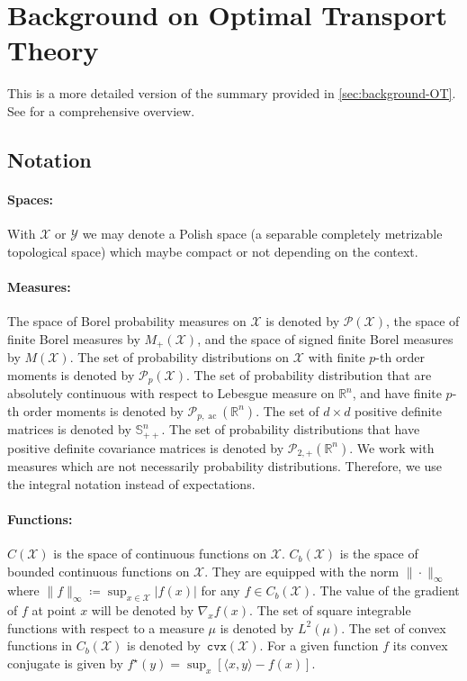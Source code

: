 \documentclass[10pt]{article}
\newcommand{\op}[1]{\operatorname{#1}}
\newcommand{\cvx}{\mathtt{cvx}}
\newcommand{\real}{\mathbb{R}}
\newcommand{\calP}{\mathcal{P}}
\newcommand{\calX}{\mathcal{X}}
\newcommand{\calY}{\mathcal{Y}}
\numberwithin{equation}{section}
\begin{document}
\appendix
\newpage
\section{Background on Optimal Transport Theory}\label{app:background-OT}
This is a more detailed version of the summary provided in \autoref{sec:background-OT}. See \citet{villani2003topics} for a comprehensive overview. 
\subsection{Notation} 

\paragraph{Spaces:} With $\calX$ or $\calY$ we may denote a Polish space (a separable completely metrizable topological space) which maybe compact or not depending on the context. 

\paragraph{Measures:}
The space of Borel probability measures on $\calX$ is denoted by $\calP(\calX)$, the space of finite Borel measures by $M_+(\calX)$, and the space of signed finite Borel measures by $M(\calX)$. 
The set of probability distributions on $\calX$ with finite $p$-th order moments is denoted by $\mathcal{P}_p(\calX)$. 
The set of probability distribution that are absolutely continuous with respect to Lebesgue measure on $\real^n$, and have finite $p$-th order moments is denoted by $\mathcal{P}_{p,\op{ac}}(\real^n)$. 
The set of $d\times d$ positive definite matrices is denoted by $\mathbb{S}^n_{++}$. 
The set of probability distributions that have positive definite covariance matrices is denoted by $\mathcal{P}_{2,+}(\real^n)$.
We work with measures which are not necessarily probability distributions. Therefore, we use the integral notation instead of expectations. 

\paragraph{Functions:}
$C(\calX)$ is the space of continuous functions on $\calX$. $C_b(\calX)$ is the space of bounded continuous functions on $\calX$. They are equipped with the norm $\|\cdot\|_\infty$ where $\|f\|_\infty \coloneqq \sup_{x\in\calX} |f(x)|$ for any $f\in C_b(\calX)$. The value of the gradient of $f$ at point $x$ will be denoted by $\nabla_x f(x)$. 
The set of square integrable functions with respect to a measure $\mu$ is denoted by $L^2(\mu)$. 
The set of convex functions in $C_b(\calX)$ is denoted by~$\cvx(\calX)$. 
For a given function $f$ its convex conjugate is given by $f^\star(y)=\sup_{x} \left[\langle x, y\rangle - f(x)\right]$.
\end{document}
